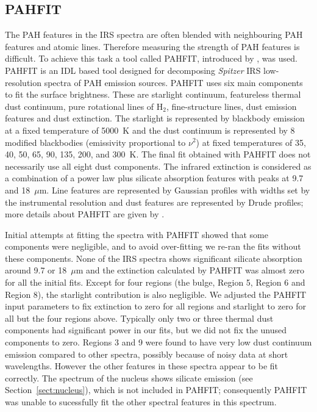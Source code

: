 \subsection{PAHFIT}
\label{sect:pahfit}
The PAH features in the IRS spectra are often blended with neighbouring PAH features and atomic lines. 
Therefore measuring the strength of PAH features is difficult.  To achieve this task a tool called PAHFIT, introduced by \citet{Smith:2007lr}, was used. 
PAHFIT is an IDL  based tool designed for decomposing {\em Spitzer} IRS low-resolution spectra of PAH emission sources.
PAHFIT uses six main components to fit the surface brightness. These are starlight continuum, featureless thermal dust continuum, 
pure rotational lines of H$_2$, fine-structure lines, dust emission features and dust extinction. The starlight is represented by  blackbody 
emission at a fixed temperature of 5000~K and the dust continuum is represented by 8 modified blackbodies (emissivity proportional to $\nu^2$)  
at fixed temperatures of 35, 40, 50, 65, 90, 135, 200, and 300~K. The final fit obtained with PAHFIT does not necessarily use
all eight dust components.
The infrared extinction is considered as a combination of a power law plus silicate absorption features with peaks at 9.7 and 18~$\mu$m. 
Line features are represented by Gaussian profiles with widths set by the instrumental resolution
and dust features are represented by Drude profiles; more details about PAHFIT are given by \citet{Smith:2007lr}.


Initial attempts at fitting the spectra with PAHFIT showed that some components were negligible, and
to avoid over-fitting we re-ran the fits without these components.
None of the IRS spectra shows significant silicate absorption around 9.7 or 18~$\mu$m and the extinction calculated by PAHFIT 
was almost zero for all the initial fits. Except for four regions (the bulge, Region 5, Region 6 and Region 8),
the starlight contribution is also negligible.
We adjusted the PAHFIT input parameters to fix extinction to zero for all regions and starlight to zero for all but the four regions above.
Typically only two or three thermal dust components had significant power in our fits, but we did not fix the unused components to zero.
Regions 3 and 9 were found to have very low dust continuum emission compared to other spectra,
possibly because of noisy data at short wavelengths. However the other features in these spectra appear to
be fit correctly.
The spectrum of the nucleus shows silicate emission (see Section~\ref{sect:nucleus}), which is not included in PAHFIT;  
consequently PAHFIT was unable to sucessfully fit the other spectral features in this spectrum.

